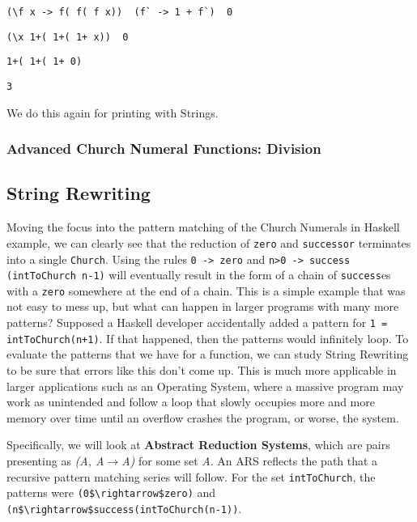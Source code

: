 \documentclass{article}
\begin{document}
        \smallskip
        \lstinline{(\f x -> f( f( f x))  (f` -> 1 + f`)  0}
        
        \lstinline{(\x 1+( 1+( 1+ x))  0}
        
        \lstinline{1+( 1+( 1+ 0)}
        
        \lstinline{3}
        
        \smallskip\noident
        We do this again for printing with Strings.
        
        \subsubsection{Advanced Church Numeral Functions: Division}
        
    \subsection{String Rewriting}
    
    Moving the focus into the pattern matching of the Church Numerals in Haskell example, we can clearly see that the reduction of \lstinline{zero} and \lstinline{successor} terminates into a single \lstinline{Church}. Using the rules \lstinline{0 -> zero} and \lstinline{n>0 -> success (intToChurch n-1)} will eventually result in the form of a chain of \lstinline{success}es with a \lstinline{zero} somewhere at the end of a chain. This is a simple example that was not easy to mess up, but what can happen in larger programs with many more patterns? Supposed a Haskell developer accidentally added a pattern for \lstinline{1 = intToChurch(n+1)}. If that happened, then the patterns would infinitely loop. To evaluate the patterns that we have for a function, we can study String Rewriting to be sure that errors like this don't come up. This is much more applicable in larger applications such as an Operating System, where a massive program may work as unintended and follow a loop that slowly occupies more and more memory over time until an overflow crashes the program, or worse, the system.
    
    \medskip\noindent
    Specifically, we will look at \textbf{Abstract Reduction Systems}, which are pairs presenting as \textit{(A, A$\rightarrow$A)} for some set \textit{A}. An ARS reflects the path that a recursive pattern matching series will follow. For the set \lstinline{intToChurch}, the patterns were \lstinline{(0$\rightarrow$zero)} and \lstinline{(n$\rightarrow$success(intToChurch(n-1))}.
    
\end{document}
